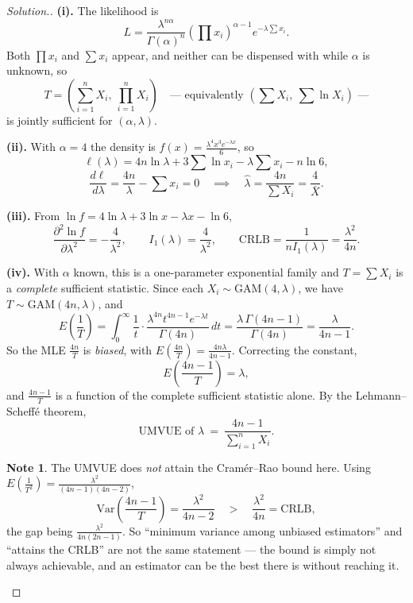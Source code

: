 \documentclass[12pt,a4paper]{report}
\theoremstyle{definition}
\newtheorem{note}[thm]{Note}
\theoremstyle{plain}
\newenvironment{solution}
  {\renewcommand{\qedsymbol}{}\begin{proof}[\textit{Solution}.]}
  {\end{proof}}
\begin{document}
\begin{solution}
\textbf{(i).} The likelihood is
\[L=\frac{\lambda^{n\alpha}}{\Gamma(\alpha)^n}
\left(\prod x_i\right)^{\alpha-1}e^{-\lambda\sum x_i}.\]
Both $\prod x_i$ and $\sum x_i$ appear, and neither can be dispensed with while
$\alpha$ is unknown, so
\[T=\left(\sum_{i=1}^nX_i,\ \prod_{i=1}^nX_i\right)
\quad\text{--- equivalently }\left(\sum X_i,\ \sum\ln X_i\right)\text{ ---}\]
is jointly sufficient for $(\alpha,\lambda)$.

\textbf{(ii).} With $\alpha=4$ the density is
$f(x)=\frac{\lambda^4x^3e^{-\lambda x}}{6}$, so
\[\ell(\lambda)=4n\ln\lambda+3\sum\ln x_i-\lambda\sum x_i-n\ln 6,\]
\[\frac{d\ell}{d\lambda}=\frac{4n}{\lambda}-\sum x_i=0
\quad\implies\quad \hat\lambda=\frac{4n}{\sum X_i}=\frac{4}{\bar X}.\]

\textbf{(iii).} From $\ln f=4\ln\lambda+3\ln x-\lambda x-\ln 6$,
\[\frac{\partial^2\ln f}{\partial\lambda^2}=-\frac{4}{\lambda^2},\qquad
I_1(\lambda)=\frac{4}{\lambda^2},\qquad
\text{CRLB}=\frac{1}{nI_1(\lambda)}=\frac{\lambda^2}{4n}.\]

\textbf{(iv).} With $\alpha$ known, this is a one-parameter exponential family and
$T=\sum X_i$ is a \emph{complete} sufficient statistic. Since each
$X_i\sim\text{GAM}(4,\lambda)$, we have $T\sim\text{GAM}(4n,\lambda)$, and
\[E\!\left(\frac{1}{T}\right)
=\int_0^\infty\frac{1}{t}\cdot\frac{\lambda^{4n}t^{4n-1}e^{-\lambda t}}
{\Gamma(4n)}\,dt=\frac{\lambda\,\Gamma(4n-1)}{\Gamma(4n)}=\frac{\lambda}{4n-1}.\]
So the MLE $\frac{4n}{T}$ is \emph{biased}, with
$E\!\left(\frac{4n}{T}\right)=\frac{4n\lambda}{4n-1}$. Correcting the constant,
\[E\!\left(\frac{4n-1}{T}\right)=\lambda,\]
and $\frac{4n-1}{T}$ is a function of the complete sufficient statistic alone. By
the Lehmann--Scheff\'e theorem,
\[\text{UMVUE of }\lambda\ =\ \frac{4n-1}{\sum_{i=1}^nX_i}.\]

\begin{note}
The UMVUE does \emph{not} attain the Cram\'er--Rao bound here. Using
$E\!\left(\frac{1}{T^2}\right)=\frac{\lambda^2}{(4n-1)(4n-2)}$,
\[\text{Var}\!\left(\frac{4n-1}{T}\right)=\frac{\lambda^2}{4n-2}
\quad>\quad \frac{\lambda^2}{4n}=\text{CRLB},\]
the gap being $\frac{\lambda^2}{4n(2n-1)}$. So ``minimum variance among unbiased
estimators'' and ``attains the CRLB'' are not the same statement --- the bound is
simply not always achievable, and an estimator can be the best there is without
reaching it.
\end{note}
\end{solution}
\end{document}
